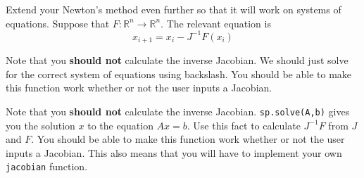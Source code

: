 \begin{problem}
Extend your Newton's method even further so that it will work on systems of equations. Suppose that $F: \mathbb{R}^n \rightarrow \mathbb{R}^n $. The relevant equation is
\[
x_{i+1} = x_i - J^{-1}F(x_i)
\]
\begin{matlab}
 Note that you {\bf should not} calculate the inverse Jacobian. We should just solve for the correct system of equations using backslash. You should be able to make this function work whether or not the user inputs a Jacobian.
\end{matlab}
\begin{python}
Note that you {\bf should not} calculate the inverse Jacobian. {\tt sp.solve(A,b)} gives you the solution $x$ to the equation $Ax=b$. Use this fact to calculate $J^{-1}F$ from $J$ and $F$.  You should be able to make this function work whether or not the user inputs a Jacobian. This also means that you will have to implement your own {\tt jacobian} function.
\end{python}
\end{problem}

